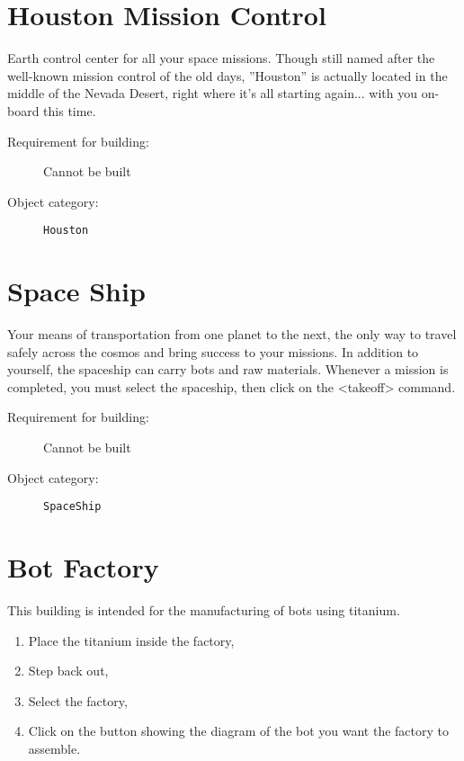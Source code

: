 \section{Houston Mission Control}

Earth control center for all your space missions. Though still named after the well-known mission control of the old days, ''Houston'' is actually located in the middle of the Nevada Desert, right where it's all starting again... with you on-board this time.

\begin{description}
    \item[Requirement for building:] Cannot be built
    \item[Object category:] \texttt{Houston}
\end{description}


\section{Space Ship}

Your means of transportation from one planet to the next, the only way to travel safely across the cosmos and bring success to your missions. In addition to yourself, the spaceship can carry bots and raw materials. Whenever a mission is completed, you must select the spaceship, then click on the <takeoff> command.

\begin{description}
    \item[Requirement for building:] Cannot be built
    \item[Object category:] \texttt{SpaceShip}
\end{description}


\section{Bot Factory}

This building is intended for the manufacturing of bots using titanium.

\begin{enumerate}
    \item Place the titanium inside the factory,
    \item Step back out,
    \item Select the factory,
    \item Click on the button showing the diagram of the bot you want the factory to assemble.
\end{enumerate}

